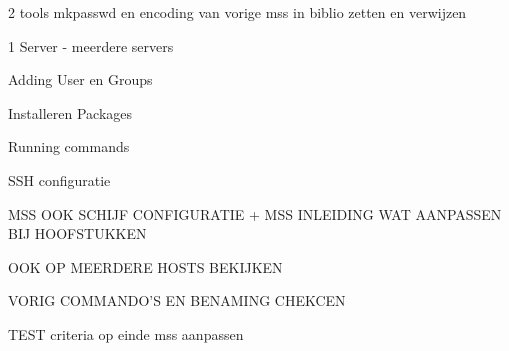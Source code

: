 2 tools mkpasswd en encoding van vorige mss in biblio zetten en verwijzen

1 Server - meerdere servers

Adding User en Groups

Installeren Packages

Running commands

SSH configuratie

MSS OOK SCHIJF CONFIGURATIE + MSS INLEIDING WAT AANPASSEN BIJ HOOFSTUKKEN

OOK OP MEERDERE HOSTS BEKIJKEN

VORIG COMMANDO'S EN BENAMING CHEKCEN

TEST criteria op einde mss aanpassen